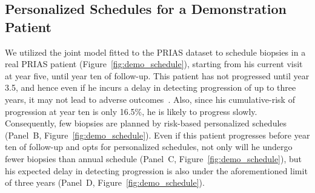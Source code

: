 \subsection{Personalized Schedules for a Demonstration Patient}
We utilized the joint model fitted to the PRIAS dataset to schedule biopsies in a real PRIAS patient (Figure~\ref{fig:demo_schedule}), starting from his current visit at year five, until year ten of follow-up. This patient has not progressed until year 3.5, and hence even if he incurs a delay in detecting progression of up to three years, it may not lead to adverse outcomes~\citep{carvalho}. Also, since his cumulative-risk of progression at year ten is only 16.5\%, he is likely to progress slowly. Consequently, few biopsies are planned by risk-based personalized schedules (Panel~B, Figure~\ref{fig:demo_schedule}). Even if this patient progresses before year ten of follow-up and opts for personalized schedules, not only will he undergo fewer biopsies than annual schedule (Panel~C, Figure~\ref{fig:demo_schedule}), but his expected delay in detecting progression is also under the aforementioned limit of three years (Panel~D, Figure~\ref{fig:demo_schedule}).
